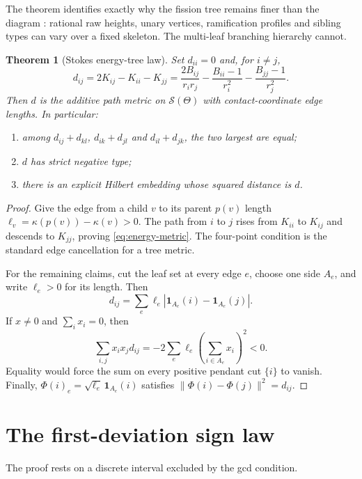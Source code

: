 \documentclass[11pt,a4paper]{amsart}
\theoremstyle{plain}
\newtheorem{theorem}{Theorem}[section]
\theoremstyle{definition}
\begin{document}
The theorem identifies exactly why the fission tree remains finer than the diagram
\cite{Doucot2026Basic}: rational raw heights, unary vertices, ramification profiles and sibling
types can vary over a fixed skeleton.  The multi-leaf branching hierarchy cannot.

\begin{theorem}[Stokes energy-tree law]\label{thm:energy-tree}
Set $d_{ii}=0$ and, for $i\ne j$,
\begin{equation}\label{eq:energy-metric}
 d_{ij}=2K_{ij}-K_{ii}-K_{jj}
 =\frac{2B_{ij}}{r_ir_j}-\frac{B_{ii}-1}{r_i^2}-\frac{B_{jj}-1}{r_j^2}.
\end{equation}
Then $d$ is the additive path metric on $\mathcal S(\Theta)$ with contact-coordinate edge lengths.
In particular:
\begin{enumerate}[label=(\roman*)]
\item among $d_{ij}+d_{kl}$, $d_{ik}+d_{jl}$ and $d_{il}+d_{jk}$, the two largest are equal;
\item $d$ has strict negative type;
\item there is an explicit Hilbert embedding whose squared distance is $d$.
\end{enumerate}
\end{theorem}

\begin{proof}
Give the edge from a child $v$ to its parent $p(v)$ length
$\ell_v=\kappa(p(v))-\kappa(v)>0$.  The path from $i$ to $j$ rises from $K_{ii}$ to $K_{ij}$ and
descends to $K_{jj}$, proving \eqref{eq:energy-metric}.  The four-point condition is the standard
edge cancellation for a tree metric.

For the remaining claims, cut the leaf set at every edge $e$, choose one side $A_e$, and write
$\ell_e>0$ for its length.  Then
\[
 d_{ij}=\sum_e\ell_e\left|\mathbf 1_{A_e}(i)-\mathbf 1_{A_e}(j)\right|.
\]
If $x\ne0$ and $\sum_i x_i=0$, then
\[
 \sum_{i,j}x_ix_jd_{ij}=-2\sum_e\ell_e\left(\sum_{i\in A_e}x_i\right)^2<0.
\]
Equality would force the sum on every positive pendant cut $\{i\}$ to vanish.  Finally,
$\Phi(i)_e=\sqrt{\ell_e}\,\mathbf1_{A_e}(i)$ satisfies
$\|\Phi(i)-\Phi(j)\|^2=d_{ij}$.
\end{proof}

\section{The first-deviation sign law}\label{sec:sign}

The proof rests on a discrete interval excluded by the gcd condition.
\end{document}

